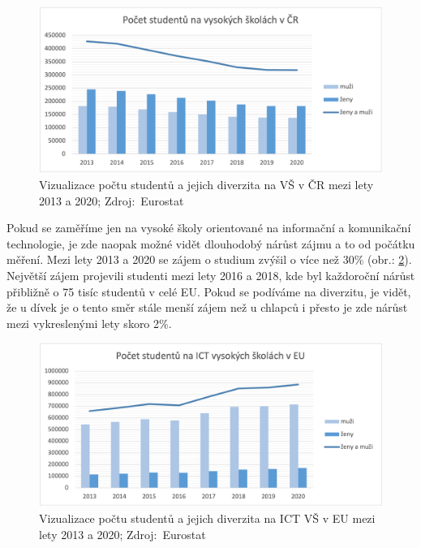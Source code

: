 \documentclass[12pt]{report}			%
\begin{document}
            \begin{figure}[h]
                \centering
                \includegraphics[width=16cm]{Maturitni Prace/images/vs_CZ.png}
                \caption[Vizualizace diverzity na VŠ v ČR 2013/20]{Vizualizace počtu studentů a jejich diverzita na VŠ v ČR mezi lety 2013 a 2020; Zdroj:~Eurostat}
                \label{fig:vs_CZ}
            \end{figure}
            
            Pokud se zaměříme jen na vysoké školy orientované na informační a komunikační technologie, je zde naopak možné vidět dlouhodobý nárůst zájmu a to od počátku měření. Mezi lety 2013 a 2020 se zájem o studium zvýšil o více než 30\% (obr.: \ref{fig:ICT_EU}). Největší zájem projevili studenti mezi lety 2016 a 2018, kde byl každoroční nárůst přibližně o 75 tisíc studentů v celé EU. Pokud se podíváme na diverzitu, je vidět, že u dívek je o tento směr stále menší zájem než u chlapců i přesto je zde nárůst mezi vykreslenými lety skoro 2\%. \cite{StudentsTeritaryEducation}
            
            \begin{figure}[h]
                \centering
                \includegraphics[width=16cm]{Maturitni Prace/images/ICT_EU.png}
                \caption[Vizualizace diverzity na ICT VŠ v EU 2013/20]{Vizualizace počtu studentů a jejich diverzita na ICT VŠ v EU mezi lety 2013 a 2020; Zdroj:~Eurostat}
                \label{fig:ICT_EU}
            \end{figure} 
\end{document}
